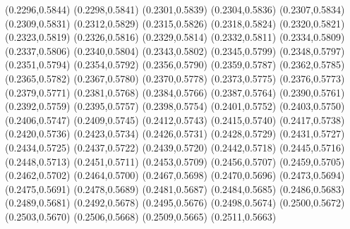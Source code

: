 \PST@Filltriangle(0.2296,0.5844)
\PST@Filltriangle(0.2298,0.5841)
\PST@Filltriangle(0.2301,0.5839)
\PST@Filltriangle(0.2304,0.5836)
\PST@Filltriangle(0.2307,0.5834)
\PST@Filltriangle(0.2309,0.5831)
\PST@Filltriangle(0.2312,0.5829)
\PST@Filltriangle(0.2315,0.5826)
\PST@Filltriangle(0.2318,0.5824)
\PST@Filltriangle(0.2320,0.5821)
\PST@Filltriangle(0.2323,0.5819)
\PST@Filltriangle(0.2326,0.5816)
\PST@Filltriangle(0.2329,0.5814)
\PST@Filltriangle(0.2332,0.5811)
\PST@Filltriangle(0.2334,0.5809)
\PST@Filltriangle(0.2337,0.5806)
\PST@Filltriangle(0.2340,0.5804)
\PST@Filltriangle(0.2343,0.5802)
\PST@Filltriangle(0.2345,0.5799)
\PST@Filltriangle(0.2348,0.5797)
\PST@Filltriangle(0.2351,0.5794)
\PST@Filltriangle(0.2354,0.5792)
\PST@Filltriangle(0.2356,0.5790)
\PST@Filltriangle(0.2359,0.5787)
\PST@Filltriangle(0.2362,0.5785)
\PST@Filltriangle(0.2365,0.5782)
\PST@Filltriangle(0.2367,0.5780)
\PST@Filltriangle(0.2370,0.5778)
\PST@Filltriangle(0.2373,0.5775)
\PST@Filltriangle(0.2376,0.5773)
\PST@Filltriangle(0.2379,0.5771)
\PST@Filltriangle(0.2381,0.5768)
\PST@Filltriangle(0.2384,0.5766)
\PST@Filltriangle(0.2387,0.5764)
\PST@Filltriangle(0.2390,0.5761)
\PST@Filltriangle(0.2392,0.5759)
\PST@Filltriangle(0.2395,0.5757)
\PST@Filltriangle(0.2398,0.5754)
\PST@Filltriangle(0.2401,0.5752)
\PST@Filltriangle(0.2403,0.5750)
\PST@Filltriangle(0.2406,0.5747)
\PST@Filltriangle(0.2409,0.5745)
\PST@Filltriangle(0.2412,0.5743)
\PST@Filltriangle(0.2415,0.5740)
\PST@Filltriangle(0.2417,0.5738)
\PST@Filltriangle(0.2420,0.5736)
\PST@Filltriangle(0.2423,0.5734)
\PST@Filltriangle(0.2426,0.5731)
\PST@Filltriangle(0.2428,0.5729)
\PST@Filltriangle(0.2431,0.5727)
\PST@Filltriangle(0.2434,0.5725)
\PST@Filltriangle(0.2437,0.5722)
\PST@Filltriangle(0.2439,0.5720)
\PST@Filltriangle(0.2442,0.5718)
\PST@Filltriangle(0.2445,0.5716)
\PST@Filltriangle(0.2448,0.5713)
\PST@Filltriangle(0.2451,0.5711)
\PST@Filltriangle(0.2453,0.5709)
\PST@Filltriangle(0.2456,0.5707)
\PST@Filltriangle(0.2459,0.5705)
\PST@Filltriangle(0.2462,0.5702)
\PST@Filltriangle(0.2464,0.5700)
\PST@Filltriangle(0.2467,0.5698)
\PST@Filltriangle(0.2470,0.5696)
\PST@Filltriangle(0.2473,0.5694)
\PST@Filltriangle(0.2475,0.5691)
\PST@Filltriangle(0.2478,0.5689)
\PST@Filltriangle(0.2481,0.5687)
\PST@Filltriangle(0.2484,0.5685)
\PST@Filltriangle(0.2486,0.5683)
\PST@Filltriangle(0.2489,0.5681)
\PST@Filltriangle(0.2492,0.5678)
\PST@Filltriangle(0.2495,0.5676)
\PST@Filltriangle(0.2498,0.5674)
\PST@Filltriangle(0.2500,0.5672)
\PST@Filltriangle(0.2503,0.5670)
\PST@Filltriangle(0.2506,0.5668)
\PST@Filltriangle(0.2509,0.5665)
\PST@Filltriangle(0.2511,0.5663)

